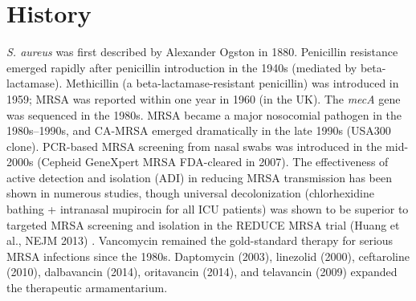 \section*{History}
\textit{S. aureus} was first described by Alexander Ogston in 1880. Penicillin resistance emerged rapidly after penicillin introduction in the 1940s (mediated by beta-lactamase). Methicillin (a beta-lactamase-resistant penicillin) was introduced in 1959; MRSA was reported within one year in 1960 (in the UK). The \textit{mecA} gene was sequenced in the 1980s. MRSA became a major nosocomial pathogen in the 1980s--1990s, and CA-MRSA emerged dramatically in the late 1990s (USA300 clone). PCR-based MRSA screening from nasal swabs was introduced in the mid-2000s (Cepheid GeneXpert MRSA FDA-cleared in 2007). The effectiveness of active detection and isolation (ADI) in reducing MRSA transmission has been shown in numerous studies, though universal decolonization (chlorhexidine bathing + intranasal mupirocin for all ICU patients) was shown to be superior to targeted MRSA screening and isolation in the REDUCE MRSA trial (Huang et al., NEJM 2013) \cite{huang2013targeted}. Vancomycin remained the gold-standard therapy for serious MRSA infections since the 1980s. Daptomycin (2003), linezolid (2000), ceftaroline (2010), dalbavancin (2014), oritavancin (2014), and telavancin (2009) expanded the therapeutic armamentarium.

